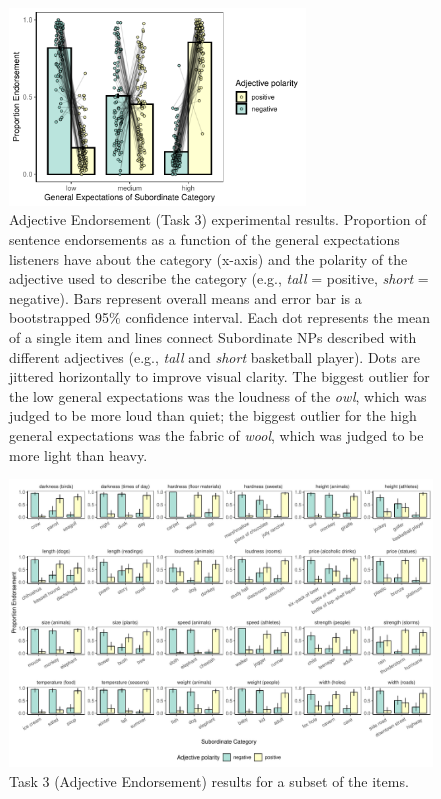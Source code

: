 \documentclass[doc]{apa6}
\begin{document}
\begin{figure}[!t]
\centering
\includegraphics[width=0.7\textwidth]{figs/bars_adj_finalExpt_prereg_bars_syncDodge.pdf}
\caption{Adjective Endorsement (Task 3) experimental results. Proportion of sentence endorsements as a function of the general expectations listeners have about the category (x-axis) and the polarity of the adjective used to describe the category (e.g., \emph{tall} = positive, \emph{short} = negative). Bars represent overall means and error bar is a bootstrapped 95\% confidence interval. Each dot represents the mean of a single item and lines connect Subordinate NPs described with different adjectives (e.g., \emph{tall} and \emph{short} basketball player). Dots are jittered horizontally to improve visual clarity. The biggest outlier for the low general expectations was the loudness of the \emph{owl}, which was judged to be more loud than quiet; the biggest outlier for the high general expectations was the fabric of \emph{wool}, which was judged to be more light than heavy. }\label{fig:adjEndorseMain}
\end{figure}



\begin{figure}[t!]
\centering
\includegraphics[width=\textwidth]{figs/bars_adj_finalExpt_pilot_byItem.pdf}
\caption{Task 3 (Adjective Endorsement) results for a subset of the items.}\label{fig:adjEndorseItems}
\end{figure}
\end{document}
